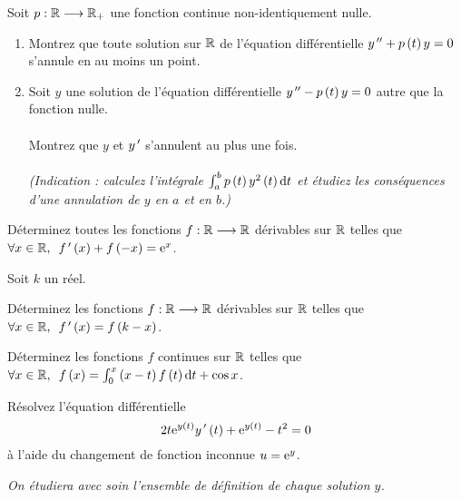 \begin{exoss}
Soit \(p:\mathbb{R}\longrightarrow\mathbb{R}_+\) une fonction continue non-identiquement nulle.

\begin{enumerate}
    \item Montrez que toute solution sur \(\mathbb{R}\) de l'équation différentielle \(y^{\,\prime\prime}+p\left(t\right)y=0\) s'annule en au moins un point. \\
    \item Soit \(y\) une solution de l'équation différentielle \(y^{\,\prime\prime}-p\left(t\right)y=0\) autre que la fonction nulle. \\\\ Montrez que \(y\) et \(y^{\,\prime}\) s'annulent au plus une fois. \\\\ \textit{(Indication : calculez l'intégrale \(\int_a^bp\paren{t}y^2\paren{t}\odif{t}\) et étudiez les conséquences d'une annulation de \(y\) en \(a\) et en \(b\).)}
\end{enumerate}
\end{exoss}

\begin{exoss}
Déterminez toutes les fonctions \(f:\mathbb{R}\longrightarrow\mathbb{R}\) dérivables sur \(\mathbb{R}\) telles que \(\quantifs{\forall x\in\R}f\prim\paren{x}+f\paren{-x}=\e{x}\).
\end{exoss}

\begin{exoss}
Soit \(k\) un réel.

Déterminez les fonctions \(f:\mathbb{R}\longrightarrow\mathbb{R}\) dérivables sur \(\mathbb{R}\) telles que \(\quantifs{\forall x\in\R}f\prim\paren{x}=f\paren{k-x}\).
\end{exoss}

\begin{exoss}
Déterminez les fonctions \(f\) continues sur \(\mathbb{R}\) telles que \(\quantifs{\forall x\in\R}f\paren{x}=\int_0^x\paren{x-t}f\paren{t}\odif{t}+\cos x\).
\end{exoss}

\begin{exoss}
Résolvez l'équation différentielle \[2t\mathrm{e}^{y\left(t\right)}y^{\,\prime}\left(t\right)+\mathrm{e}^{y\left(t\right)}-t^2=0\] à l'aide du changement de fonction inconnue \(u=\mathrm{e}^{y}\).

\textit{On étudiera avec soin l'ensemble de définition de chaque solution \(y\).}
\end{exoss}
